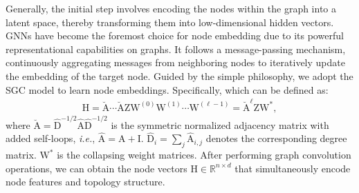 Generally, the initial step involves encoding the nodes within the graph into a latent space, thereby transforming them into low-dimensional hidden vectors. GNNs have become the foremost choice for node embedding due to its powerful representational capabilities on graphs. It follows a message-passing mechanism, continuously aggregating messages from neighboring nodes to iteratively update the embedding of the target node. Guided by the simple philosophy, we adopt the SGC model \cite{wu2019simplifying} to learn node embeddings. Specifically, which can be defined as:
\begin{equation}
\label{sgc}
\begin{aligned}
\mathrm{H}\!=\!\breve{\mathrm{A}}\cdots\breve{\mathrm{A}}\mathrm{Z}\mathrm{W}^{(0)}\mathrm{W}^{(1)}\cdots\mathrm{W}^{(\ell-1)}\!=\!\breve{\mathrm{A}}^\ell\mathrm{Z}\mathrm{W}^\ast,
\end{aligned}   %
\end{equation}
where $\breve{\mathrm{A}}\!=\!\hat{\mathrm{D}}^{-1/2}\hat{\mathrm{A}}\hat{\mathrm{D}}^{-1/2}$ is the symmetric normalized adjacency matrix with added self-loops, \textit{i.e.}, $\hat{\mathrm{A}}\!=\!\mathrm{A}+\mathrm{I}$. $\hat{\mathrm{D}}_i\!=\!\sum_j\hat{\mathrm{A}}_{i,j}$ denotes the corresponding degree matrix. $\mathrm{W}^{\ast}$ is the collapsing weight matrices. After performing graph convolution operations, we can obtain the node vectors $\mathrm{H}\!\in\!\mathbb R^{n\times d}$ that simultaneously encode node features and topology structure. %

